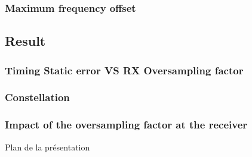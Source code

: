 \documentclass[11pt]{beamer}
\begin{document}
\begin{frame}
\frametitle{Maximum frequency offset}


\end{frame}

\subsection{Result}
\subsubsection{}
\begin{frame}
\frametitle{Timing Static error VS RX Oversampling factor}

\end{frame}

\subsubsection{Constellation}

\begin{frame}
\frametitle{Impact of the oversampling factor at the receiver}


\end{frame}

{
	\begin{frame}[noframenumbering]{Plan de la présentation}
		\tableofcontents
	\end{frame}
}
\end{document}

